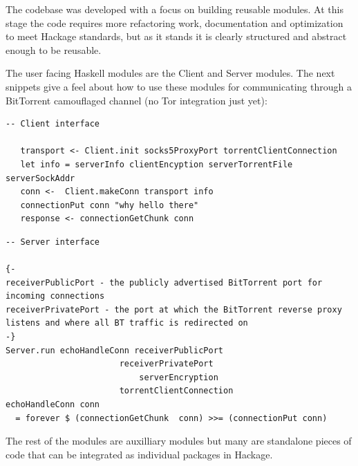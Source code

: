 \documentclass[11pt]{article} %
\begin{document}
The codebase was developed with a focus on building reusable modules. At this stage the code requires more refactoring work, documentation and optimization to meet Hackage standards, but as it stands it is clearly structured and abstract enough to be reusable.

The user facing Haskell modules are the Client and Server modules. The next snippets give a feel about how to use these modules for communicating through a BitTorrent camouflaged channel (no Tor integration just yet):

\begin{lstlisting}
-- Client interface

   transport <- Client.init socks5ProxyPort torrentClientConnection
   let info = serverInfo clientEncyption serverTorrentFile serverSockAddr
   conn <-  Client.makeConn transport info
   connectionPut conn "why hello there"
   response <- connectionGetChunk conn
\end{lstlisting}

\begin{lstlisting}
-- Server interface

{-
receiverPublicPort - the publicly advertised BitTorrent port for incoming connections
receiverPrivatePort - the port at which the BitTorrent reverse proxy listens and where all BT traffic is redirected on
-}
Server.run echoHandleConn receiverPublicPort
					   receiverPrivatePort
				           serverEncryption
					   torrentClientConnection	
echoHandleConn conn
  = forever $ (connectionGetChunk  conn) >>= (connectionPut conn)
\end{lstlisting}

The rest of the modules are auxilliary modules but many are standalone pieces of code that can be integrated as individual packages in Hackage.
\end{document}
